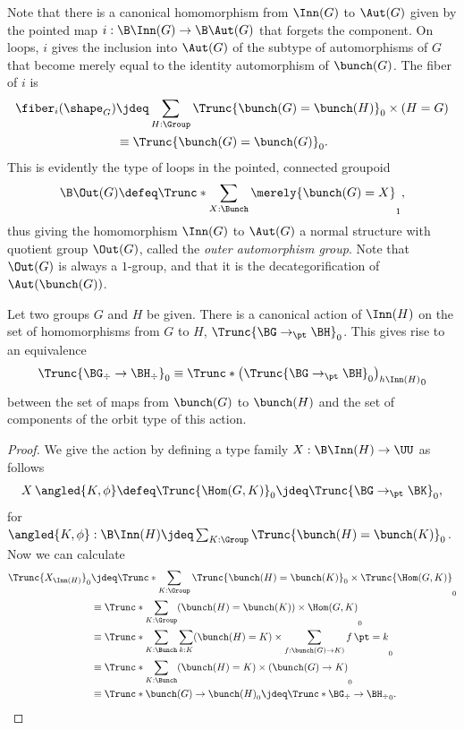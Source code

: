 Note that there is a canonical homomorphism from $\Inn(G)$ to $\Aut(G)$
given by the pointed map $i : \B\Inn(G) \to \B\Aut(G)$ that forgets the component.
On loops, $i$ gives the inclusion into $\Aut(G)$ of the subtype of automorphisms of $G$
that become merely equal to the identity automorphism of $\bunch(G)$.
The fiber of $i$ is
\begin{align*}
  \fiber_i(\shape_G)
  &\jdeq \sum_{H : \Group} \Trunc{\bunch(G) = \bunch(H)}_0 \times (H = G) \\
  &\equiv \Trunc{\bunch(G) = \bunch(G)}_0.
\end{align*}
This is evidently the type of loops in the pointed, connected groupoid
\[
  \B\Out(G) \defeq \Trunc*{\sum_{X : \Bunch}\merely{\bunch(G) = X}}_1,
\]
thus giving the homomorphism $\Inn(G)$ to $\Aut(G)$ a normal structure with
quotient group $\Out(G)$, called the \emph{outer automorphism group}.
Note that $\Out(G)$ is always a $1$-group,
and that it is the decategorification of $\Aut(\bunch(G))$.

\begin{theorem}\label{thm:hom-mod-conj}
  Let two groups $G$ and $H$ be given.
  There is a canonical action of $\Inn(H)$
  on the set of homomorphisms from $G$ to $H$, $\Trunc{\BG \to_\pt \BH}_0$.
  This gives rise to an equivalence
  \[
    \Trunc{\BG_\div \to \BH_\div}_0 \equiv \Trunc*{\left(\Trunc{\BG \to_\pt \BH}_0\right) _{h\Inn(H)}}_0
  \]
  between the set of maps from $\bunch(G)$ to $\bunch(H)$ and the set of
  components of the orbit type of this action.
\end{theorem}
\begin{proof}
  We give the action by defining a type family $X : \B\Inn(H) \to \UU$ as follows
  \[
    X\, \angled{K,\phi} \defeq \Trunc{\Hom(G,K)}_0 \jdeq \Trunc{\BG \to_\pt \BK}_0,
  \]
  for $\angled{K,\phi} : \B\Inn(H) \jdeq \sum_{K : \Group} \Trunc{\bunch(H) = \bunch(K)}_0$.
  Now we can calculate
  \begin{align*}
    \Trunc{X_{\Inn(H)}}_0
    &\jdeq \Trunc*{\sum_{K:\Group}\Trunc{\bunch(H)=\bunch(K)}_0\times\Trunc{\Hom(G,K)}}_0 \\
    &\equiv \Trunc*{\sum_{K:\Group}(\bunch(H)=\bunch(K))\times\Hom(G,K)}_0 \\
    &\equiv \Trunc*{\sum_{K:\Bunch}\sum_{k:K}(\bunch(H)=K)\times\sum_{f:\bunch(G)\to K)}\mathop f \pt = k}_0 \\
    &\equiv \Trunc*{\sum_{K:\Bunch} (\bunch(H)=K) \times(\bunch(G) \to K)}_0 \\
    &\equiv \Trunc*{\bunch(G)\to\bunch(H)}_0 \jdeq \Trunc*{\BG_\div \to \BH_\div}_0.\qedhere
  \end{align*}
\end{proof}

